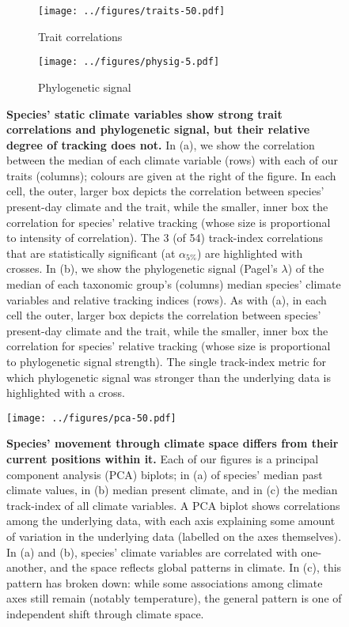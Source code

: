 \documentclass[12pt]{report}
\begin{document}
\clearpage
\begin{figure}[h!]
  \begin{center}
    \begin{subfigure}{.45\textwidth}
      \texttt{[image: ../figures/traits-50.pdf]}
      \caption{Trait correlations}
    \end{subfigure}
    \begin{subfigure}{.45\textwidth}
      \texttt{[image: ../figures/physig-5.pdf]}
      \caption{Phylogenetic signal}
    \end{subfigure}
  \end{center}
  \caption{\doublespacing \textbf{Species' static climate variables
      show strong trait correlations and phylogenetic signal, but
      their relative degree of tracking does not.} In (a), we show the
    correlation between the median of each climate variable (rows)
    with each of our traits (columns); colours are given at the right
    of the figure. In each cell, the outer, larger box depicts the
    correlation between species' present-day climate and the trait,
    while the smaller, inner box the correlation for species' relative
    tracking (whose size is proportional to intensity of
    correlation). The 3 (of 54) track-index correlations that are
    statistically significant (at $\alpha_{5\%}$) are highlighted with
    crosses. In (b), we show the phylogenetic signal (Pagel's
    $\lambda$\supercite{Pagel1999}) of the median of each taxonomic
    group's (columns) median species' climate variables and relative
    tracking indices (rows). As with (a), in each cell the outer,
    larger box depicts the correlation between species' present-day
    climate and the trait, while the smaller, inner box the
    correlation for species' relative tracking (whose size is
    proportional to phylogenetic signal strength). The single
    track-index metric for which phylogenetic signal was stronger than
    the underlying data is highlighted with a cross.}
  \label{traits}
\end{figure}

\clearpage
\begin{figure}[h!]
  \begin{center}
    \texttt{[image: ../figures/pca-50.pdf]}
  \end{center}
  \caption{\doublespacing \textbf{Species' movement through climate
      space differs from their current positions within it.} Each of
    our figures is a principal component analysis (PCA) biplots; in
    (a) of species' median past climate values, in (b) median present
    climate, and in (c) the median track-index of all climate
    variables. A PCA biplot shows correlations among the underlying
    data, with each axis explaining some amount of variation in the
    underlying data (labelled on the axes themselves). In (a) and (b),
    species' climate variables are correlated with one-another, and
    the space reflects global patterns in climate. In (c), this
    pattern has broken down: while some associations among climate
    axes still remain (notably temperature), the general pattern is
    one of independent shift through climate space.}
  \label{pca}
\end{figure}
\end{document}
